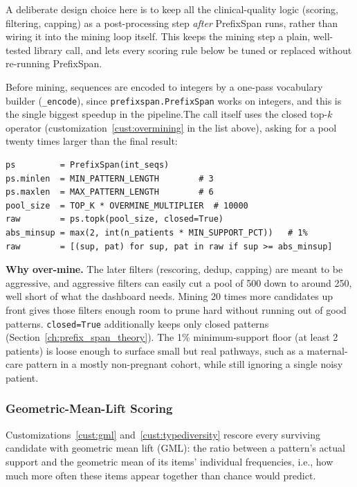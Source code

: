 A deliberate design choice here is to keep all the clinical-quality logic (scoring, filtering, capping) as a post-processing step \emph{after} PrefixSpan runs, rather than wiring it into the mining loop itself. This keeps the mining step a plain, well-tested library call, and lets every scoring rule below be tuned or replaced without re-running PrefixSpan.

Before mining, sequences are encoded to integers by a one-pass vocabulary builder (\texttt{\_encode}), since \texttt{prefixspan.PrefixSpan} works on integers, and this is the single biggest speedup in the pipeline.The call itself uses the closed top-$k$ operator (customization~\ref{cust:overmining} in the list above), asking for a pool twenty times larger than the final result:

\vspace{0.25cm}

\begin{lstlisting}[style=pythonstyle]
ps         = PrefixSpan(int_seqs)
ps.minlen  = MIN_PATTERN_LENGTH        # 3
ps.maxlen  = MAX_PATTERN_LENGTH        # 6
pool_size  = TOP_K * OVERMINE_MULTIPLIER  # 10000
raw        = ps.topk(pool_size, closed=True)
abs_minsup = max(2, int(n_patients * MIN_SUPPORT_PCT))   # 1%
raw        = [(sup, pat) for sup, pat in raw if sup >= abs_minsup]
\end{lstlisting}

\noindent \textbf{Why over-mine.} The later filters (rescoring, dedup, capping) are meant to be aggressive, and aggressive filters can easily cut a pool of 500 down to around 250, well short of what the dashboard needs. Mining 20 times more candidates up front gives those filters enough room to prune hard without running out of good patterns. \texttt{closed=True} additionally keeps only closed patterns (Section~\ref{ch:prefix_span_theory}). The 1\% minimum-support floor (at least 2 patients) is loose enough to surface small but real pathways, such as a maternal-care pattern in a mostly non-pregnant cohort, while still ignoring a single noisy patient.

\subsubsection*{Geometric-Mean-Lift Scoring}

Customizations~\ref{cust:gml} and~\ref{cust:typediversity} rescore every surviving candidate with geometric mean lift (GML): the ratio between a pattern's actual support and the geometric mean of its items' individual frequencies, i.e., how much more often these items appear together than chance would predict.

